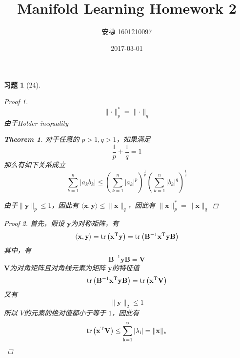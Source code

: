 \documentclass[a4paper, UTF8]{ctexart}
\title{Manifold Learning Homework 2}
\date{2017-03-01}
\author{安捷 1601210097}
\newtheorem*{exercise}{\textbf{习题}}
\newtheorem*{theorem}{Theorem}
\begin{document}
\maketitle
\begin{exercise}[24]
  \begin{proof}[Proof 1]
    \begin{equation*}
      \lVert \cdot \rVert_p^* = \lVert \cdot \rVert_q
    \end{equation*}
    由于Holder inequality
    \begin{theorem}
      对于任意的 $p > 1, q>1$，如果满足
      \begin{equation*}
        \frac{1}{p} + \frac{1}{q} = 1
      \end{equation*}
      那么有如下关系成立
      \begin{equation*}
        \sum_{k=1}^n |a_k b_k| \le \left( \sum_{k=1}^n |a_k|^p \right)^{\frac{1}{p}}\left( \sum_{k=1}^n |b_k|^q \right)^{\frac{1}{q}}
      \end{equation*}
    \end{theorem}
  由于$\lVert \mathbf{y}\rVert_p \le 1$，因此有 $\langle \mathbf{x}, \mathbf{y}\rangle \le \lVert \mathbf{x} \rVert_q$，因此有 $\lVert \mathbf{x} \rVert_p^* = \lVert \mathbf{x} \rVert_q$
  \end{proof}
  \begin{proof}[Proof 2]
    首先，假设 $\mathbf{y}$为对称矩阵，有
    \begin{equation*}
      \langle \mathbf{x}, \mathbf{y} \rangle = \rm{tr} \left( \mathbf{x}^T \mathbf{y} \right) = \rm{tr} \left( \mathbf{B}^{-1}\mathbf{x}^T \mathbf{y} \mathbf{B} \right)
    \end{equation*}
    其中，有
    \begin{equation*}
      \mathbf{B}^{-1} \mathbf{y} \mathbf{B}=\mathbf{V}
    \end{equation*}
    $\mathbf{V}$为对角矩阵且对角线元素为矩阵 $\mathbf{y}$的特征值
    \begin{equation*}
      \rm{tr}\left( \mathbf{B}^{-1} \mathbf{x}^T \mathbf{y} \mathbf{B} \right) = \rm{tr} \left( \mathbf{x}^T \mathbf{V} \right)
    \end{equation*}
    又有
    \begin{equation*}
      \lVert \mathbf{y} \rVert_2 \le 1
    \end{equation*}
    所以 $V$的元素的绝对值都小于等于 $1$，因此有
    \begin{equation*}
      \rm{tr} \left( \mathbf{x}^T \mathbf{V} \right) \le \sum_{k=1}^n |\lambda_i| = \lVert \mathbf{x} \rVert_*

\end{equation*}
\end{proof}
\end{exercise}
\end{document}
